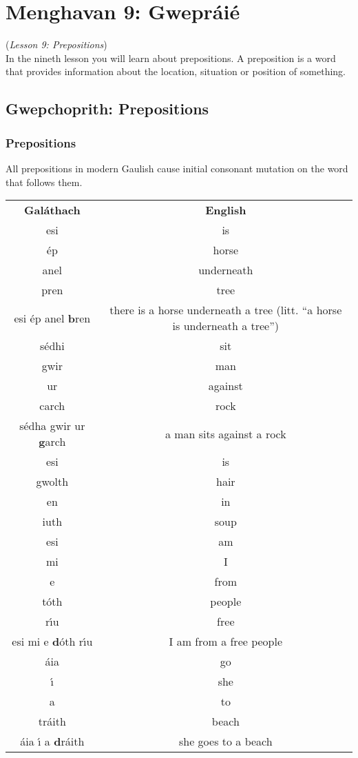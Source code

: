\section{Menghavan 9: Gwepr\'{a}i\'{e}}
(\textit{Lesson 9: Prepositions})\\

In the nineth lesson you will learn about prepositions. A preposition is a word that provides information about the location, situation or position of something.

\subsection{Gwepchoprith: Prepositions}
\subsubsection{Prepositions}

All prepositions in modern Gaulish cause initial consonant mutation on the word that follows them.
\begin{table}[H]
\centering
\begin{tabular}{cc}
  \toprule
  \textbf{Gal\'{a}thach} & \textbf{English}\\
  \cmidrule(lr){1-1}\cmidrule(lr){2-2}
  esi & is\\
  \'{e}p & horse\\
  anel & underneath\\
  pren & tree\\
  esi \'{e}p anel \textbf{b}ren & there is a horse underneath a tree (litt. ``a horse is underneath a tree'')\\
  \cmidrule(lr){1-1}\cmidrule(lr){2-2}
  s\'{e}dhi & sit\\
  gwir & man\\
  ur & against\\
  carch & rock\\
  s\'{e}dha gwir ur \textbf{g}arch & a man sits against a rock\\
  \cmidrule(lr){1-1}\cmidrule(lr){2-2}
  esi & is\\
  gwolth & hair\\
  en & in\\
  iuth & soup\\
  \cmidrule(lr){1-1}\cmidrule(lr){2-2}
  esi & am\\
  mi & I\\
  e & from\\
  t\'{o}th & people\\
  r\'{\i}u & free\\
  esi mi e \textbf{d}\'{o}th r\'{\i}u & I am from a free people\\
  \cmidrule(lr){1-1}\cmidrule(lr){2-2}
  \'{a}ia & go\\
  \'{\i} & she\\
  a & to\\
  tr\'{a}ith & beach\\
  \'{a}ia \'{\i} a \textbf{d}r\'{a}ith & she goes to a beach\\
  \bottomrule
\end{tabular}
\label{examples_prepositions}
\end{table}

